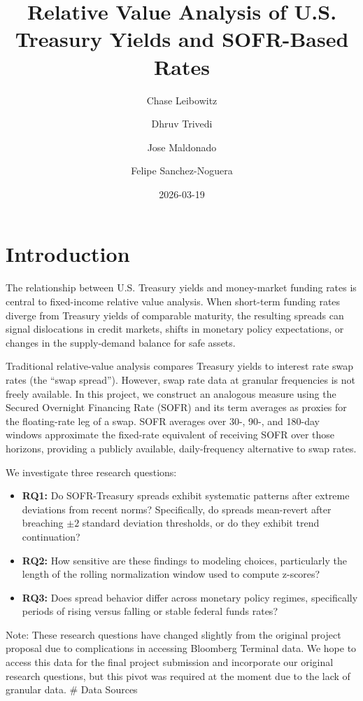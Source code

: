 \documentclass[
  11pt,
  letterpaper,
  DIV=11,
  numbers=noendperiod]{scrartcl}
\title{Relative Value Analysis of U.S. Treasury Yields and SOFR-Based
Rates}
\author{Chase Leibowitz \and Dhruv Trivedi \and Jose
Maldonado \and Felipe Sanchez-Noguera}
\date{2026-03-19}
\providecommand{\tightlist}{%
  \setlength{\itemsep}{0pt}\setlength{\parskip}{0pt}}
\renewcommand*\contentsname{Table of contents}
\newcommand\contentsname{Table of contents}
\begin{document}
\maketitle

\renewcommand*\contentsname{Table of contents}
{
\hypersetup{linkcolor=}
\setcounter{tocdepth}{3}
\tableofcontents
}

\section{Introduction}\label{introduction}

The relationship between U.S. Treasury yields and money-market funding
rates is central to fixed-income relative value analysis. When
short-term funding rates diverge from Treasury yields of comparable
maturity, the resulting spreads can signal dislocations in credit
markets, shifts in monetary policy expectations, or changes in the
supply-demand balance for safe assets.

Traditional relative-value analysis compares Treasury yields to interest
rate swap rates (the ``swap spread''). However, swap rate data at
granular frequencies is not freely available. In this project, we
construct an analogous measure using the Secured Overnight Financing
Rate (SOFR) and its term averages as proxies for the floating-rate leg
of a swap. SOFR averages over 30-, 90-, and 180-day windows approximate
the fixed-rate equivalent of receiving SOFR over those horizons,
providing a publicly available, daily-frequency alternative to swap
rates.

We investigate three research questions:

\begin{itemize}
\tightlist
\item
  \textbf{RQ1:} Do SOFR-Treasury spreads exhibit systematic patterns
  after extreme deviations from recent norms? Specifically, do spreads
  mean-revert after breaching \(\pm2\) standard deviation thresholds, or
  do they exhibit trend continuation?
\item
  \textbf{RQ2:} How sensitive are these findings to modeling choices,
  particularly the length of the rolling normalization window used to
  compute z-scores?
\item
  \textbf{RQ3:} Does spread behavior differ across monetary policy
  regimes, specifically periods of rising versus falling or stable
  federal funds rates?
\end{itemize}

Note: These research questions have changed slightly from the original
project proposal due to complications in accessing Bloomberg Terminal
data. We hope to access this data for the final project submission and
incorporate our original research questions, but this pivot was required
at the moment due to the lack of granular data. \# Data Sources
\end{document}
